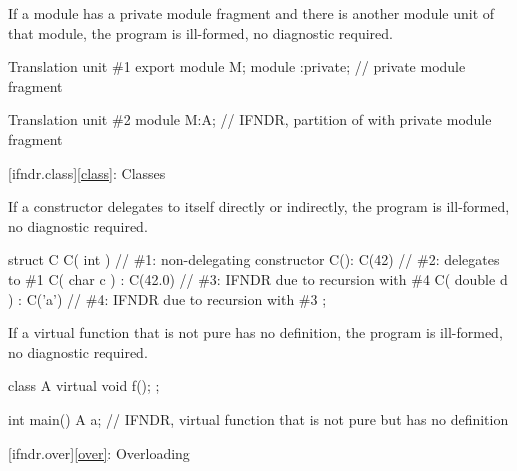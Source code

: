 
\pnum
If a module has a private module fragment
and there is another module unit of that module,
the program is ill-formed, no diagnostic required.

\pnum
\begin{example}
\begin{codeblocktu}{Translation unit \#1}
export module M;
module :private;    // private module fragment
\end{codeblocktu}
\begin{codeblocktu}{Translation unit \#2}
module M:A;         // IFNDR, partition of  with private module fragment
\end{codeblocktu}
\end{example}

[ifndr.class]{\ref*{class}: Classes}


\pnum
If a constructor delegates to itself directly or indirectly,
the program is ill-formed, no diagnostic required.

\pnum
\begin{example}
\begin{codeblock}
struct C {
  C( int ) { }                  // \#1: non-delegating constructor
  C(): C(42) { }                // \#2: delegates to \#1
  C( char c ) : C(42.0) { }     // \#3: IFNDR due to recursion with \#4
  C( double d ) : C('a') { }    // \#4: IFNDR due to recursion with \#3
};
\end{codeblock}
\end{example}


\pnum
If a virtual function that is not pure
has no definition,
the program is ill-formed, no diagnostic required.

\pnum
\begin{example}
\begin{codeblock}
class A {
  virtual void f();
};

int main() {
  A a;      // IFNDR, virtual function that is not pure but has no definition
}
\end{codeblock}
\end{example}

[ifndr.over]{\ref*{over}: Overloading}


